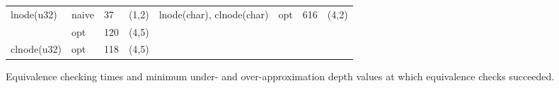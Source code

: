 \begin{figure}[H]
\begin{scriptsize}
\begin{tabular}{lllclllc}
lnode(u32) & naive & 37 & (1,2) &                                              lnode(char), clnode(char) & opt & 616 & (4,2)         \\
           & opt & 120 & (4,5)   &                                               & & & \\
clnode(u32) & opt & 118 & (4,5)   &                                               & & & \\
\bottomrule
\end{tabular}
\end{scriptsize}
\vspace{-5px}
\caption{\label{tab:results}Equivalence checking times and minimum under- and over-approximation depth values at which equivalence checks succeeded.}
\vspace{-5px}
\end{figure}
